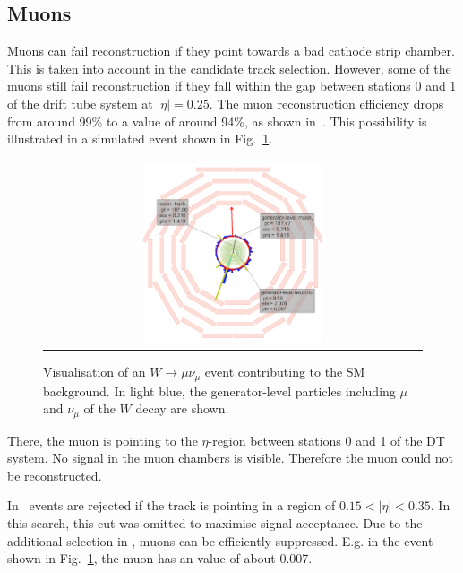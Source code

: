 \subsection*{Muons}
Muons can fail reconstruction if they point towards a bad cathode strip chamber.
This is taken into account in the candidate track selection.
However, some of the muons still fail reconstruction if they fall within the gap between stations 0 and 1 of the drift tube system at $|\eta|=0.25$.
The muon reconstruction efficiency drops from around 99\% to a value of around 94\%, as shown in~\cite{bib:CMS:DT_Thesis,bib:CMS:DT_8TeV_AN}.
This possibility is illustrated in a simulated event shown in Fig.~\ref{fig:LostMuon}.
\begin{figure}[!tb]
  \centering 
  \begin{tabular}{c}
    \includegraphics[width=0.49\textwidth]{figures/analysis/Background/LostMuon_Lumi_456307_event_182377157_NEW.png}
  \end{tabular}
  \caption{Visualisation of an $W\rightarrow \mu\nu_{\mu}$ event contributing to the SM background. 
           In light blue, the generator-level particles including $\mu$ and $\nu_{\mu}$ of the $W$ decay are shown.}
  \label{fig:LostMuon}
\end{figure}
There, the muon is pointing to the $\eta$-region between stations 0 and 1 of the DT system.
No signal in the muon chambers is visible. 
Therefore the muon could not be reconstructed.

In~\cite{bib:CMS:DT_Thesis,bib:CMS:DT_8TeV_AN} events are rejected if the track is pointing in a region of $0.15<|\eta|<0.35$.
In this search, this cut was omitted to maximise signal acceptance. 
Due to the additional selection in \ias, muons can be efficiently suppressed.
E.g. in the event shown in Fig.~\ref{fig:LostMuon}, the muon has an \ias value of about 0.007.\\



